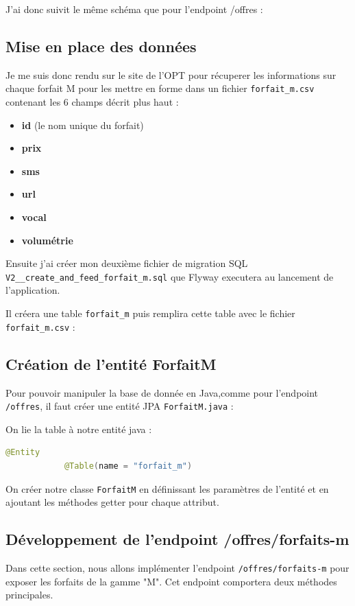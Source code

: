 \documentclass[11pt]{article}
\begin{document}
		J'ai donc suivit le même schéma que pour l'endpoint /offres :
		
		\subsection*{Mise en place des données}
		\label{subsec:mpd}
		Je me suis donc rendu sur le site de l'OPT pour récuperer les informations sur chaque forfait M pour les mettre en forme dans un fichier \texttt{forfait\_m.csv}
		contenant les 6 champs décrit plus haut : 
		\begin{itemize} 
			\item \textbf{id} (le nom unique du forfait)
			\item \textbf{prix}
			\item \textbf{sms}
			\item \textbf{url}
			\item \textbf{vocal}
			\item \textbf{volumétrie}
		\end{itemize}
		
		Ensuite j'ai créer mon deuxième fichier de migration SQL \texttt{V2\_\_create\_and\_feed\_forfait\_m.sql} que Flyway executera au lancement de l'application. 
		
		Il créera une table \texttt{forfait\_m} puis remplira cette table avec le fichier \texttt{forfait\_m.csv} : 
		\subsection*{Création de l'entité ForfaitM}
		\label{subsec:JPA}
		Pour pouvoir manipuler la base de donnée en Java,comme pour l'endpoint \texttt{/offres}, il faut créer une entité JPA \texttt{ForfaitM.java} :
		
		On lie la table à notre entité java :
		\begin{lstlisting}[language=java]
			@Entity
			@Table(name = "forfait_m") 
		\end{lstlisting}
		
		On créer notre classe \texttt{ForfaitM} en définissant les paramètres de l'entité et en ajoutant les méthodes getter pour chaque attribut.
			
		\subsection*{Développement de l'endpoint /offres/forfaits-m}
		\label{subsec:endpoint-m}
		Dans cette section, nous allons implémenter l'endpoint \texttt{/offres/forfaits-m} pour exposer les forfaits de la gamme "M". Cet endpoint comportera deux méthodes principales.
		
\end{document}
